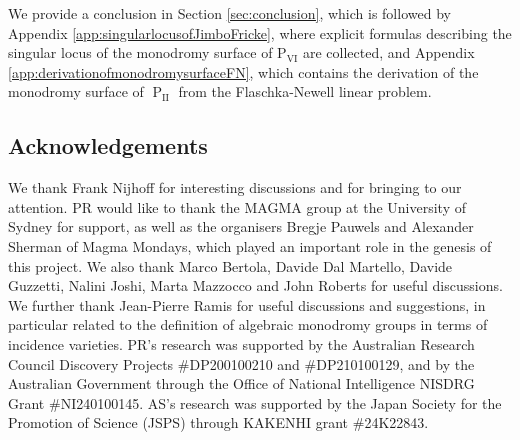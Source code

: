 \documentclass[a4paper,reqno]{amsart}
\numberwithin{equation}{section}
\newcommand\Psix{\textrm{P}_{\textrm{VI}}}
\newcommand{\pain}[1]{\operatorname{P}_{\mathrm{#1}}}
\numberwithin{equation}{section}
\begin{document}
We provide a conclusion in Section \ref{sec:conclusion}, which is followed by Appendix \ref{app:singularlocusofJimboFricke}, where explicit formulas describing the singular locus of the monodromy surface of $\Psix$ are collected,
and Appendix \ref{app:derivationofmonodromysurfaceFN}, which contains the derivation of the monodromy surface of $\pain{II}$ from the Flaschka-Newell linear problem.





\subsection{Acknowledgements}
We thank Frank Nijhoff for interesting discussions and for bringing  to our attention. PR would like to thank the MAGMA group at the University of Sydney for support, as well as the organisers Bregje Pauwels and Alexander Sherman of Magma Mondays, which played an important role in the genesis of this project.
We also thank Marco Bertola, Davide Dal Martello, Davide Guzzetti, Nalini Joshi, Marta Mazzocco and John Roberts for useful discussions.
We further thank Jean-Pierre Ramis for useful discussions and suggestions, in particular related to the definition of algebraic monodromy groups in terms of incidence varieties.
PR's research was supported by the
Australian Research Council Discovery Projects \#DP200100210 and \#DP210100129, and by the Australian Government through the Office of National Intelligence NISDRG Grant
\#NI240100145.
AS's research was supported by the Japan Society for the Promotion of Science (JSPS) through KAKENHI grant \#24K22843.
\end{document}
